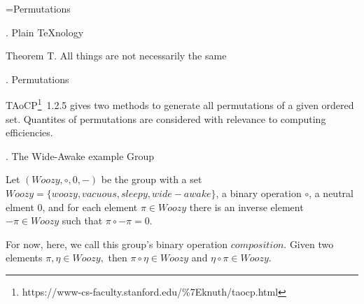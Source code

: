
\def\a{\left(\matrix}
\def\b{\cr}
\def\c{\right)}

\def\d{\footnote*{http://web.mit.edu/sp.268/www/rubik.pdf}}
\def\f{\footnote*{https://www-cs-faculty.stanford.edu/\%7Eknuth/taocp.html}}
\def\e{\bigskip}
\def\R{{Woozy}}
\def\*{\circ}

\vsize=300pt %
\hsize=480pt %
\footline={\tenrm Permutations\quad\dotfill\quad \folio}

. Plain \TeX nology %

\proclaim Theorem T. All things are not necessarily the same

. Permutations

\e
TAoCP\f~1.2.5 gives two methods to generate all permutations
of a given ordered set. Quantites of permutations are considered
with relevance to computing efficiencies.

. The Wide-Awake example Group

\e
Let $(\R,\*,0,-)$ be the group with a set
$\R=\{woozy, vacuous, sleepy, wide-awake\}$, a binary
operation $\*$, a neutral elment $0$, and
for each element $\pi\in\R$ there is an inverse element
$-\pi\in\R$ such that $\pi\*-\pi=0$.

\e
For now, here, we call this group's binary operation $composition$.
Given two elements
$\pi,\eta\in\R,$ then
$\pi\*\eta\in\R$ and $\eta\*\pi\in\R.$


\bye
